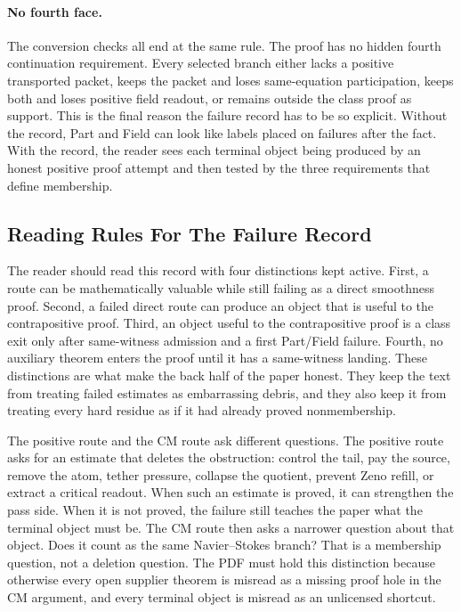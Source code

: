 \paragraph{No fourth face.}
The conversion checks all end at the same rule.
The proof has no hidden fourth continuation requirement.
Every selected branch either lacks a positive transported packet, keeps the
packet and loses same-equation participation, keeps both and loses positive
field readout, or remains outside the class proof as support.
This is the final reason the failure record has to be so explicit.
Without the record, Part and Field can look like labels placed on
failures after the fact.
With the record, the reader sees each terminal object being produced by an
honest positive proof attempt and then tested by the three requirements that
define membership.

\subsection{Reading Rules For The Failure Record}

The reader should read this record with four distinctions kept active.
First, a route can be mathematically valuable while still failing as a direct
smoothness proof.
Second, a failed direct route can produce an object that is useful to the
contrapositive proof.
Third, an object useful to the contrapositive proof is a class exit only after
same-witness admission and a first Part/Field failure.
Fourth, no auxiliary theorem enters the proof until it has a same-witness
landing.
These distinctions are what make the back half of the paper honest.
They keep the text from treating failed estimates as embarrassing debris, and
they also keep it from treating every hard residue as if it had already proved
nonmembership.

The positive route and the CM route ask different questions.
The positive route asks for an estimate that deletes the obstruction:
control the tail, pay the source, remove the atom, tether pressure, collapse
the quotient, prevent Zeno refill, or extract a critical readout.
When such an estimate is proved, it can strengthen the pass side.
When it is not proved, the failure still teaches the paper what the terminal
object must be.
The CM route then asks a narrower question about that object.
Does it count as the same Navier--Stokes branch?
That is a membership question, not a deletion question.
The PDF must hold this distinction because otherwise every open supplier
theorem is misread as a missing proof hole in the CM argument, and every
terminal object is misread as an unlicensed shortcut.

